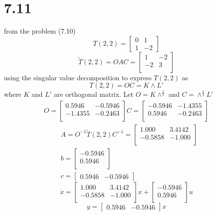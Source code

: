 \documentclass{article}
\begin{document}
\section*{7.11}
from the problem (7.10)
\[T(2,2)=
\left[
    \begin{array}{cc}
        0 & 1\\
        1 & -2
    \end{array}
\right]
\]
\[
\tilde{T}(2,2)=OAC=
\left[
    \begin{array}{cc}
        1 & -2\\
        -2 & 3\\        
    \end{array}
\right]  
\]
using the singular value decomposition to express $T(2,2)$ as
\[T(2,2)=OC=K\wedge L'\] 
where $K$ and $L'$ are orthogonal matrix.
Let $O=K\wedge^{\frac{1}{2}}$ and $C=\wedge^{\frac{1}{2}}L'$
\[
\begin{split}
O=\left[
    \begin{array}{cc}
        0.5946 & -0.5946\\
        -1.4355 & -0.2463\\
    \end{array}
\right]
C=\left[
    \begin{array}{cc}
        -0.5946 & -1.4355\\
        0.5946 & -0.2463\\
    \end{array}
\right]
\end{split} 
\]
\[
\begin{split}
&A=O^{-1}\tilde{T}(2,2)C^{-1}=
\left[
    \begin{array}{cc}
        1.000 & 3.4142\\
        -0.5858 & -1.000\\
    \end{array}
\right]
\\
&b=
\left[
    \begin{array}{c}
        -0.5946\\
        0.5946\\
    \end{array}
\right]
\\
&c=\left[
    \begin{array}{cc}
        0.5946 & -0.5946
    \end{array}
\right]
\end{split}
\]
\[
\dot{x}=
\left[
    \begin{array}{cc}
        1.000 & 3.4142\\
        -0.5858 & -1.000\\
    \end{array}
\right]x+
\left[
    \begin{array}{c}
        -0.5946\\
        0.5946\\
    \end{array}
\right]u
\]
\[
    y=\left[
        \begin{array}{cc}
            0.5946 & -0.5946
        \end{array}
    \right]x    
\]
\end{document}
